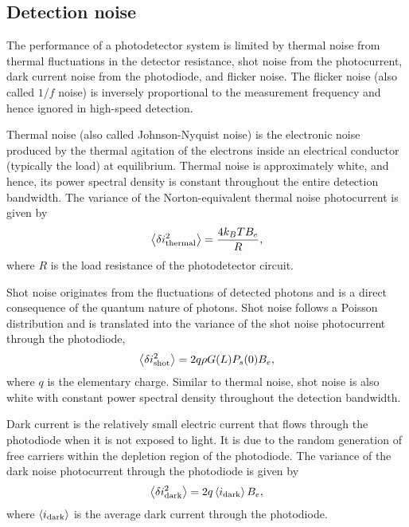 \documentclass[10pt,letterpaper]{article}
\begin{document}
\subsection{Detection noise}
The performance of a photodetector system is limited by thermal noise from thermal fluctuations in the detector resistance, shot noise from the photocurrent, dark current noise from the photodiode, and flicker noise. The flicker noise (also called $1/f$ noise) is inversely proportional to the measurement frequency and hence ignored in high-speed detection. 

Thermal noise (also called Johnson-Nyquist noise) is the electronic noise produced by the thermal agitation of the electrons inside an electrical conductor (typically the load) at equilibrium. Thermal noise is approximately white, and hence, its power spectral density is constant throughout the entire detection bandwidth. The variance of the Norton-equivalent thermal noise photocurrent is given by 
\begin{equation}
\left\langle \delta i_{\rm thermal}^2\right\rangle = \frac{4 k_B T B_e}{R},
\label{eq:thermal}
\end{equation}
where $R$ is the load resistance of the photodetector circuit. 

Shot noise originates from the fluctuations of detected photons and is a direct consequence of the quantum nature of photons. Shot noise follows a Poisson distribution and is translated into the variance of the shot noise photocurrent through the photodiode,
\begin{equation}
\left\langle \delta i_{\rm shot}^2\right\rangle = 2 q \rho G(L) P_s(0) B_e,
\label{eq:shot}
\end{equation}
where $q$ is the elementary charge. Similar to thermal noise, shot noise is also white with constant power spectral density throughout the detection bandwidth. 

Dark current is the relatively small electric current that flows through the photodiode when it is not exposed to light. It is due to the random generation of free carriers within the depletion region of the photodiode. The variance of the dark noise photocurrent through the photodiode is given by
\begin{equation}
\left\langle \delta i_{\rm dark}^2\right\rangle = 2 q \left\langle i_{\rm dark}\right\rangle B_e,
\label{eq:dark}
\end{equation}
where $\left\langle i_{\rm dark}\right\rangle$ is the average dark current through the photodiode. 
\end{document}
